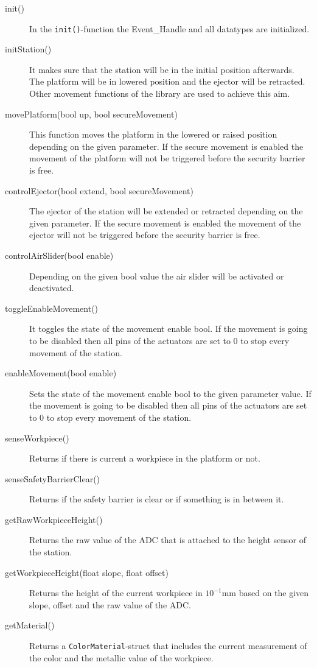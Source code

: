 \begin{description} 
	\item[init()] In the \texttt{init()}-function the Event\_Handle and all datatypes are initialized. 
	\item[initStation()] It makes sure that the station will be in the initial position afterwards. The platform will be in lowered position and the ejector will be retracted. Other movement functions of the library are used to achieve this aim.
	\item[movePlatform(bool up, bool secureMovement)] This function moves the platform in the lowered or raised position depending on the given parameter. If the secure movement is enabled the movement of the platform will not be triggered before the security barrier is free. 
	\item[controlEjector(bool extend, bool secureMovement)] The ejector of the station will be extended or retracted depending on the given parameter. If the secure movement is enabled the movement of the ejector will not be triggered before the security barrier is free. 
	\item[controlAirSlider(bool enable)] Depending on the given bool value the air slider will be activated or deactivated.
	\item[toggleEnableMovement()] It toggles the state of the movement enable bool. If the movement is going to be disabled then all pins of the actuators are set to 0 to stop every movement of the station.
	\item[enableMovement(bool enable)] Sets the state of the movement enable bool to the given parameter value. If the movement is going to be disabled then all pins of the actuators are set to 0 to stop every movement of the station.
	\item[senseWorkpiece()] Returns if there is current a workpiece in the platform or not.
	\item[senseSafetyBarrierClear()] Returns if the safety barrier is clear or if something is in between it.
	\item[getRawWorkpieceHeight()] Returns the raw value of the ADC that is attached to the height sensor of the station. 
	\item[getWorkpieceHeight(float slope, float offset)] Returns the height of the current workpiece in $10^{-1}$mm based on the given slope, offset and the raw value of the ADC.
	\item[getMaterial()] Returns a \texttt{ColorMaterial}-struct that includes the current measurement of the color and the metallic value of the workpiece.
\end{description}

